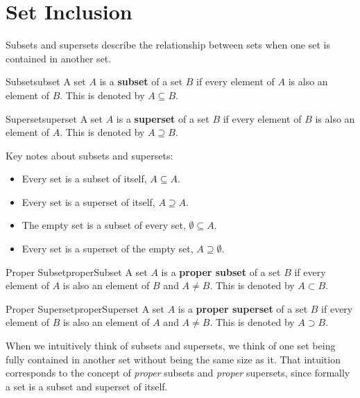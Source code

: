 \section{Set Inclusion}
Subsets and supersets describe the relationship between sets when one set is contained in
another set.

\begin{definition}{Subset}{subset}
  A set \( A \) is a \textbf{subset} of a set \( B \) if every element of
  \( A \) is also an element of \( B \).  This is denoted by \( A \subseteq B \).
\end{definition}

\begin{definition}
    {Superset}{superset}
    A set \( A \) is a \textbf{superset} of a set \( B \) if every element of
    \( B \) is also an element of \( A \). This is denoted by \( A \supseteq B \).
\end{definition}

Key notes about subsets and supersets:
\begin{itemize}
  \item Every set is a subset of itself, \( A \subseteq A \).
  \item Every set is a superset of itself, \( A \supseteq A \).
  \item The empty set is a subset of every set, \( \emptyset \subseteq A \).
  \item Every set is a superset of the empty set, \( A \supseteq \emptyset \).
\end{itemize}


\begin{definition}{Proper Subset}{properSubset}
  A set \( A \) is a \textbf{proper subset} of a set \( B \) if every element of
  \( A \) is also an element of \( B \) and \( A \neq B \). This is denoted by
  \( A \subset B \).
\end{definition}

\begin{definition}
    {Proper Superset}{properSuperset}
    A set \( A \) is a \textbf{proper superset} of a set \( B \) if every element of
    \( B \) is also an element of \( A \) and \( A \neq B \). This is denoted by
    \( A \supset B \).
\end{definition}

When we intuitively think of subsets and supersets, we think of one set being
fully contained in another set without being the same size as it. That intuition
corresponds to the concept of \emph{proper} subsets and \emph{proper} supersets,
since formally a set is a subset and superset of itself.


